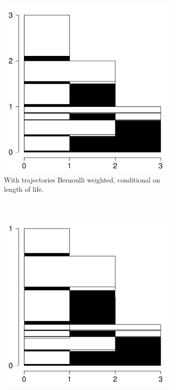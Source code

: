 \documentclass{bmcart}
\begin{document}
\begin{figure}
     \begin{subfigure}[b]{0.4\textwidth}
        \includegraphics[scale=.4]{Figures/BernCondTrajProbs.pdf}
        \caption{With trajectories Bernoulli weighted, conditional on length of life.}
        \label{fig:b3}
    \end{subfigure}
    ~ 
    \begin{subfigure}[b]{0.4\textwidth}
        \includegraphics[scale=.4]{Figures/BernTrajProbsWeighted}

\end{subfigure}
\end{figure}
\end{document}
